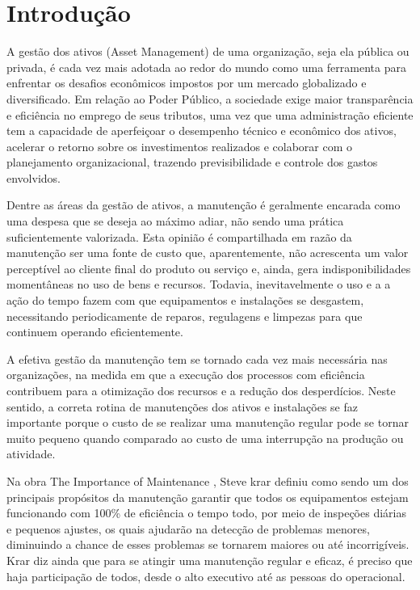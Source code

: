 \chapter{Introdução}
\label{cap-introducao}

A gestão dos ativos (Asset Management) de uma organização, seja ela pública ou privada, é cada vez mais adotada ao redor do mundo como uma ferramenta para enfrentar os desafios econômicos impostos por um mercado globalizado e diversificado. Em relação ao Poder Público, a sociedade exige maior transparência e eficiência no emprego de seus tributos, uma vez que uma administração eficiente tem a capacidade de aperfeiçoar o desempenho técnico e econômico dos ativos, acelerar o retorno sobre os investimentos realizados e colaborar com o planejamento organizacional, trazendo previsibilidade e controle dos gastos envolvidos. 

Dentre as áreas da gestão de ativos, a manutenção é geralmente encarada como uma despesa que se deseja ao máximo adiar, não sendo uma prática suficientemente valorizada. Esta opinião é compartilhada em razão da manutenção ser uma fonte de custo que, aparentemente, não acrescenta um valor perceptível ao cliente final do produto ou serviço e, ainda, gera indisponibilidades momentâneas no uso de bens e recursos. Todavia, inevitavelmente o uso e a a ação do tempo fazem com que equipamentos e instalações se desgastem, necessitando periodicamente de reparos, regulagens e limpezas para que continuem operando eficientemente.

A efetiva gestão da manutenção tem se tornado cada vez mais necessária nas organizações, na medida em que a execução dos processos com eficiência contribuem para a otimização dos recursos e a redução dos desperdícios.  Neste sentido, a correta rotina de manutenções dos ativos e instalações se faz importante porque o custo de se realizar uma manutenção regular pode se tornar muito pequeno quando comparado ao custo de uma interrupção na produção ou atividade.

Na obra The Importance of Maintenance \cite{krar2009}, Steve krar definiu como sendo um dos principais propósitos da manutenção garantir que todos os equipamentos estejam funcionando com 100\% de eficiência o tempo todo, por meio de inspeções diárias e pequenos ajustes, os quais ajudarão na detecção de problemas menores, diminuindo a chance de esses problemas se tornarem maiores ou até incorrigíveis. Krar diz ainda que para se atingir uma manutenção regular e eficaz, é preciso que haja participação de todos, desde o alto executivo até as pessoas do operacional.

